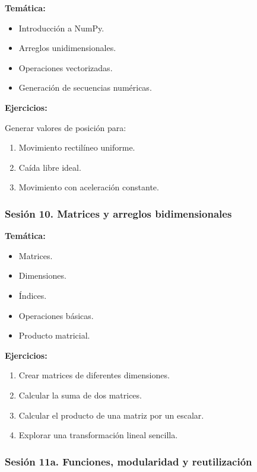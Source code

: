 \documentclass[12pt,letterpaper]{article}
\begin{document}
\textbf{Temática:}
\begin{itemize}[noitemsep]
    \item Introducción a NumPy.
    \item Arreglos unidimensionales.
    \item Operaciones vectorizadas.
    \item Generación de secuencias numéricas.
\end{itemize}

\textbf{Ejercicios:}

Generar valores de posición para:
\begin{enumerate}[noitemsep]
    \item Movimiento rectilíneo uniforme.
    \item Caída libre ideal.
    \item Movimiento con aceleración constante.
\end{enumerate}

\subsubsection*{Sesión 10. Matrices y arreglos bidimensionales}

\textbf{Temática:}
\begin{itemize}[noitemsep]
    \item Matrices.
    \item Dimensiones.
    \item Índices.
    \item Operaciones básicas.
    \item Producto matricial.
\end{itemize}

\textbf{Ejercicios:}
\begin{enumerate}[noitemsep]
    \item Crear matrices de diferentes dimensiones.
    \item Calcular la suma de dos matrices.
    \item Calcular el producto de una matriz por un escalar.
    \item Explorar una transformación lineal sencilla.
\end{enumerate}

\subsubsection*{Sesión 11a. Funciones, modularidad y reutilización}
\end{document}
